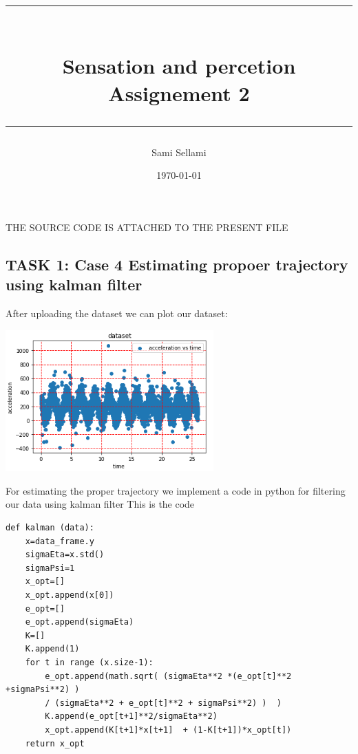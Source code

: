 \documentclass[12pt,a4paper]{report}
\title{
\rule{15cm}{1pt} \\
\Large {\bfseries Sensation and percetion} \\
\Large {\bfseries Assignement 2}\\
\rule{15cm}{1pt}}
\author{Sami Sellami}
\date{\today}
\begin{document}
\setcounter{page}{1}
\setcounter{secnumdepth}{1}
	
\selectfont

\maketitle

\titlelabel{\thetitle)\quad}
\titlespacing{\chapter}{0cm}{0cm}{0cm}
\titlespacing{\section}{0.2cm}{0cm}{0cm}

THE SOURCE CODE IS ATTACHED TO THE PRESENT FILE 

\subsection{TASK 1: Case 4 Estimating propoer trajectory using kalman filter}

After uploading the dataset we can plot our dataset:

\begin{center}
\includegraphics[width=8cm]{Capture1.png}
\end{center}

For estimating the proper trajectory we implement a code in python for filtering our data using kalman filter
This is the code 
\begin{verbatim}
def kalman (data):
    x=data_frame.y
    sigmaEta=x.std()
    sigmaPsi=1    
    x_opt=[]
    x_opt.append(x[0])    
    e_opt=[]    
    e_opt.append(sigmaEta)    
    K=[]
    K.append(1)
    for t in range (x.size-1):
        e_opt.append(math.sqrt( (sigmaEta**2 *(e_opt[t]**2 +sigmaPsi**2) ) 
        / (sigmaEta**2 + e_opt[t]**2 + sigmaPsi**2) )  )
        K.append(e_opt[t+1]**2/sigmaEta**2)    
        x_opt.append(K[t+1]*x[t+1]  + (1-K[t+1])*x_opt[t])
    return x_opt   
\end{verbatim}
\end{document}
